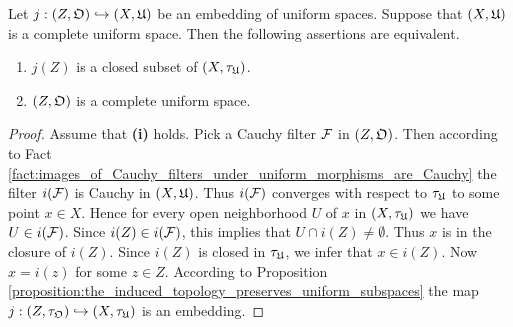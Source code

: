 \begin{proposition}\label{proposition:closed_embeddings_into_complete_space_are_complete}
Let $j:\left(Z,{\mathfrak O} \right) \hookrightarrow \left(X,{\mathfrak U}\right)$ be an embedding of uniform spaces. Suppose that $\left(X,{\mathfrak U}\right)$ is a complete uniform space. Then the following assertions are equivalent.
\begin{enumerate}[label=\emph{\textbf{(\roman*)}}, leftmargin=*]
\item $j(Z)$ is a closed subset of $\left(X,\tau_{{\mathfrak U}}\right)$.
\item $\left(Z,{\mathfrak O}\right)$ is a complete uniform space.
\end{enumerate}
\end{proposition}
\begin{proof}
Assume that \textbf{(i)} holds. Pick a Cauchy filter ${\mathcal F}$ in $\left(Z,{\mathfrak O}\right)$. Then according to Fact \ref{fact:images_of_Cauchy_filters_under_uniform_morphisms_are_Cauchy} the filter $i({\mathcal F})$ is Cauchy in $\left(X,{\mathfrak U}\right)$. Thus $i({\mathcal F})$ converges with respect to $\tau_{{\mathfrak U}}$ to some point $x\in X$. Hence for every open neighborhood $U$ of $x$ in $\left(X,\tau_{{\mathfrak U}}\right)$ we have $U\in i({\mathcal F})$. Since $i(Z) \in i({\mathcal F})$, this implies that $U\cap i(Z) \neq \emptyset$. Thus $x$ is in the closure of $i(Z)$. Since $i(Z)$ is closed in $\tau_{{\mathfrak U}}$, we infer that $x\in i(Z)$. Now $x = i(z)$ for some $z\in Z$. According to Proposition \ref{proposition:the_induced_topology_preserves_uniform_subspaces} the map $j:\left(Z,\tau_{{\mathfrak O}}\right) \hookrightarrow \left(X,\tau_{{\mathfrak U}}\right)$ is an embedding.
\end{proof}



































